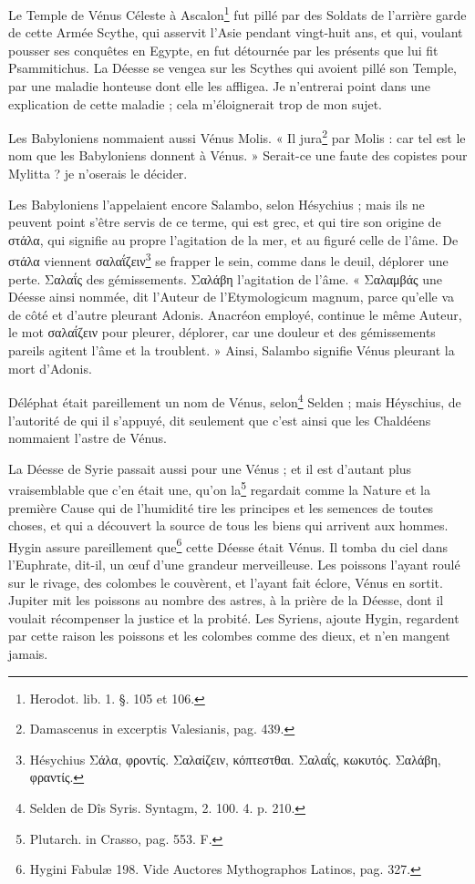 \documentclass[a4paper, 18pt, oneside]{article}
\begin{document}
Le Temple de Vénus Céleste à Ascalon\footnote{Herodot. lib. 1. §. 105 et 106.} fut pillé par des Soldats de l'arrière garde de cette Armée Scythe, qui asservit l'Asie pendant vingt-huit ans, et qui, voulant pousser ses conquêtes en Egypte, en fut détournée par les présents que lui fit Psammitichus. La Déesse se vengea sur les Scythes qui avoient pillé son Temple, par une maladie honteuse dont elle les affligea. Je n'entrerai point dans une explication de cette maladie ; cela m'éloignerait trop de mon sujet.

Les Babyloniens nommaient aussi Vénus Molis. « Il jura\footnote{Damascenus in excerptis Valesianis, pag. 439.} par Molis : car tel est le nom que les Babyloniens donnent à Vénus. » Serait-ce une faute des copistes pour Mylitta ? je n'oserais le décider.

Les Babyloniens l'appelaient encore Salambo, selon Hésychius ; mais ils ne peuvent point s'être servis de ce terme, qui est grec, et qui tire son origine de στάλα, qui signifie au propre l'agitation de la mer, et au figuré celle de l'âme. De στάλα viennent σαλαΐζειν\footnote{Hésychius Σάλα, φροντίς. Σαλαίζειν, κόπτεστθαι. Σαλαΐς, κωκυτός. Σαλάβη, φραντίς.} se frapper le sein, comme dans le deuil, déplorer une perte. Σαλαΐς des gémissements. Σαλάβη l'agitation de l'âme. « Σαλαμβάς une Déesse ainsi nommée, dit l'Auteur de l'Etymologicum magnum, parce qu'elle va de côté et d'autre pleurant Adonis. Anacréon employé, continue le même Auteur, le mot σαλαΐζειν pour pleurer, déplorer, car une douleur et des gémissements pareils agitent l'âme et la troublent. » Ainsi, Salambo signifie Vénus pleurant la mort d'Adonis.

Déléphat était pareillement un nom de Vénus, selon\footnote{Selden de Dîs Syris. Syntagm, 2. 100. 4. p. 210.} Selden ; mais Héyschius, de l'autorité de qui il s'appuyé, dit seulement que c'est ainsi que les Chaldéens nommaient l'astre de Vénus.

La Déesse de Syrie passait aussi pour une Vénus ; et il est d'autant plus vraisemblable que c'en était une, qu'on la\footnote{Plutarch. in Crasso, pag. 553. F.} regardait comme la Nature et la première Cause qui de l'humidité tire les principes et les semences de toutes choses, et qui a découvert la source de tous les biens qui arrivent aux hommes. Hygin assure pareillement que\footnote{Hygini Fabulæ 198. Vide Auctores Mythographos Latinos, pag. 327.} cette Déesse était Vénus. Il tomba du ciel dans l'Euphrate, dit-il, un œuf d'une grandeur merveilleuse. Les poissons l'ayant roulé sur le rivage, des colombes le couvèrent, et l'ayant fait éclore, Vénus en sortit. Jupiter mit les poissons au nombre des astres, à la prière de la Déesse, dont il voulait récompenser la justice et la probité. Les Syriens, ajoute Hygin, regardent par cette raison les poissons et les colombes comme des dieux, et n'en mangent jamais.
\end{document}
